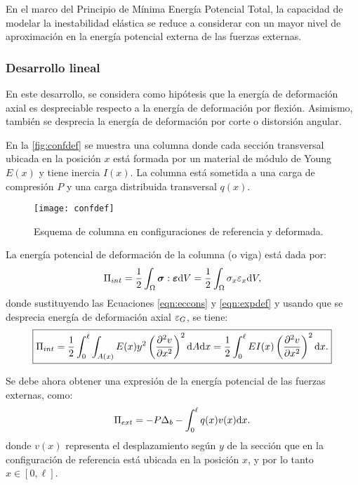 En el marco del Principio de Mínima Energía Potencial Total, la capacidad de modelar la inestabilidad elástica se reduce a considerar con un mayor nivel de aproximación en la energía potencial externa de las fuerzas externas.
%

\subsubsection{Desarrollo lineal}

En este desarrollo, se considera como hipótesis que la energía de deformación axial es despreciable respecto a la energía de deformación por flexión. %
Asimismo, también se desprecia la energía de deformación por corte o distorsión angular.

En la \autoref{fig:confdef} se muestra una columna donde cada sección transversal ubicada en la posición $x$ está formada por un material de módulo de Young $E(x)$ y tiene inercia $I(x)$. La columna está sometida a una carga de compresión $P$ y una carga distribuida transversal $q(x)$.
%
\begin{figure}[htb]
	\centering
	\texttt{[image: confdef]}
	\caption{Esquema de columna en configuraciones de referencia y deformada.}
	\label{fig:confdef}
\end{figure}

La energía potencial de deformación de la columna (o viga) está dada por:
%
\begin{equation}
\Pi_{int} = \frac{1}{2} \int_\Omega \boldsymbol{\sigma} : \boldsymbol{\varepsilon}  {\text{d}} V  = \frac{1}{2} \int_\Omega \sigma_x \varepsilon_x  {\text{d}} V,
\end{equation}
%
donde sustituyendo las Ecuaciones \eqref{eqn:eccons} y \eqref{eqn:expdef} y usando que se desprecia energía de deformación axial $\varepsilon_G$, se tiene:
%
\begin{equation}
\boxed{
\Pi_{int} = \frac{1}{2} \int_0^\ell \int_{A(x)} E(x) y^2 \left( \frac{\partial^2 v}{\partial x^2}\right)^2  {\text{d}} A {\text{d}} x 
=   \frac{1}{2} \int_0^\ell EI(x)  \left( \frac{\partial^2 v}{\partial x^2}\right)^2 {\text{d}} x.
}
\end{equation}

Se debe ahora obtener una expresión de la energía potencial de las fuerzas externas, como:
\begin{equation}
\Pi_{ext} = -P \Delta_b  - \int_0^\ell q(x) v(x) {\text{d}} x.
\end{equation}
%
donde $v(x)$ representa el desplazamiento según $y$ de la sección que en la configuración de referencia está ubicada en la posición $x$, y por lo tanto $x\in[0,\ell]$.



